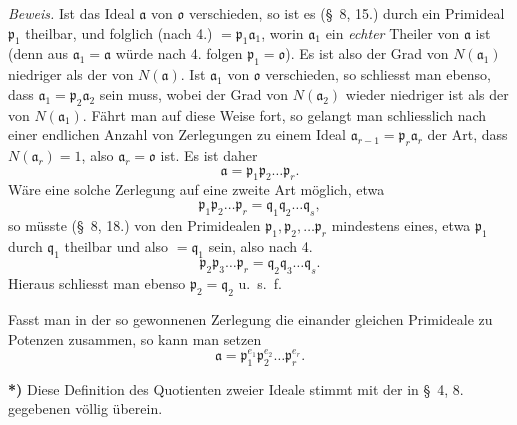 \documentclass{article}
\begin{document}
\emph{Beweis.} Ist das Ideal $\mathfrak{a}$ von $\mathfrak{o}$ verschieden, so ist es (§~8, 15.) durch ein Primideal $\mathfrak{p}_{1}$ theilbar, und folglich (nach 4.) $= \mathfrak{p}_{1}\mathfrak{a}_{1}$, worin $\mathfrak{a}_{1}$ ein \emph{echter} Theiler von $\mathfrak{a}$ ist (denn aus $\mathfrak{a}_{1} = \mathfrak{a}$ würde nach 4. folgen $\mathfrak{p}_{1} = \mathfrak{o}$). Es ist also der Grad von $N(\mathfrak{a}_{1})$ niedriger als der von $N(\mathfrak{a})$. Ist $\mathfrak{a}_{1}$ von $\mathfrak{o}$ verschieden, so schliesst man ebenso, dass $\mathfrak{a}_{1} = \mathfrak{p}_{2}\mathfrak{a}_{2}$ sein muss, wobei der Grad von $N(\mathfrak{a}_{2})$ wieder niedriger ist als der von $N(\mathfrak{a}_{1})$. Fährt man auf diese Weise fort, so gelangt man schliesslich nach einer endlichen Anzahl von Zerlegungen zu einem Ideal $\mathfrak{a}_{r-1} = \mathfrak{p}_{r}\mathfrak{a}_{r}$ der Art, dass $N(\mathfrak{a}_{r}) = 1$, also $\mathfrak{a}_{r} = \mathfrak{o}$ ist. Es ist daher
\[ \mathfrak{a} = \mathfrak{p}_{1}\mathfrak{p}_{2}\ldots\mathfrak{p}_{r}. \]
Wäre eine solche Zerlegung auf eine zweite Art möglich, etwa
\[ \mathfrak{p}_{1}\mathfrak{p}_{2}\ldots\mathfrak{p}_{r} = \mathfrak{q}_{1}\mathfrak{q}_{2}\ldots\mathfrak{q}_{s}, \]
so müsste (§~8, 18.) von den Primidealen $\mathfrak{p}_{1}, \mathfrak{p}_{2}, \ldots \mathfrak{p}_{r}$ mindestens eines, etwa $\mathfrak{p}_{1}$ durch $\mathfrak{q}_{1}$ theilbar und also $= \mathfrak{q}_{1}$ sein, also nach 4.
\[ \mathfrak{p}_{2}\mathfrak{p}_{3}\ldots\mathfrak{p}_{r} = \mathfrak{q}_{2}\mathfrak{q}_{3}\ldots\mathfrak{q}_{s}. \]
Hieraus schliesst man ebenso $\mathfrak{p}_{2} = \mathfrak{q}_{2}$ u.\ s.\ f.

Fasst man in der so gewonnenen Zerlegung die einander gleichen Primideale zu Potenzen zusammen, so kann man setzen
\[ \mathfrak{a} = \mathfrak{p}_{1}^{e_{1}}\mathfrak{p}_{2}^{e_{2}}\ldots\mathfrak{p}_{r}^{e_{r}}. \]

\textbf{*)} Diese Definition des Quotienten zweier Ideale stimmt mit der in §~4, 8. gegebenen völlig überein.

\end{document}
